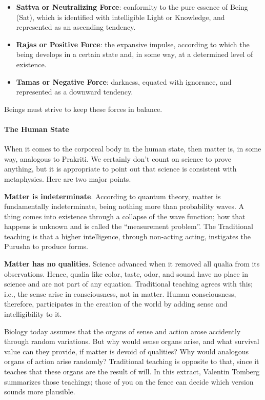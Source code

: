 \begin{itemize}
\item \textbf{Sattva or Neutralizing Force}: conformity to the pure essence of Being (Sat), which is identified with intelligible Light or Knowledge, and represented as an ascending tendency. 
\item \textbf{Rajas or Positive Force}: the expansive impulse, according to which the being develops in a certain state and, in some way, at a determined level of existence. 
\item \textbf{Tamas or Negative Force}: darkness, equated with ignorance, and represented as a downward tendency. 
\end{itemize}
Beings must strive to keep these forces in balance.

\paragraph{The Human State}
When it comes to the corporeal body in the human state, then matter is, in some way, analogous to Prakriti. We certainly don't count on science to prove anything, but it is appropriate to point out that science is consistent with metaphysics. Here are two major points.

\textbf{Matter is indeterminate}. According to quantum theory, matter is fundamentally indeterminate, being nothing more than probability waves. A thing comes into existence through a collapse of the wave function; how that happens is unknown and is called the “measurement problem”. The Traditional teaching is that a higher intelligence, through non-acting acting, instigates the Purusha to produce forms.

\textbf{Matter has no qualities}. Science advanced when it removed all qualia from its observations. Hence, qualia like color, taste, odor, and sound have no place in science and are not part of any equation. Traditional teaching agrees with this; i.e., the sense arise in consciousness, not in matter. Human consciousness, therefore, participates in the creation of the world by adding sense and intelligibility to it.

Biology today assumes that the organs of sense and action arose accidently through random variations. But why would sense organs arise, and what survival value can they provide, if matter is devoid of qualities? Why would analogous organs of action arise randomly? Traditional teaching is opposite to that, since it teaches that these organs are the result of will. In this extract, Valentin Tomberg summarizes those teachings; those of you on the fence can decide which version sounds more plausible.

